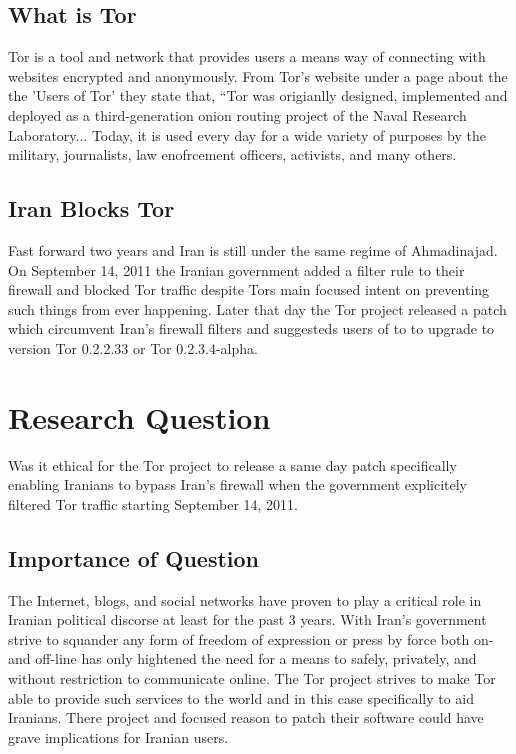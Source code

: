 \documentclass[11pt]{article}
\begin{document}
\begin{multicols}{2}
\subsection{What is Tor}

Tor is a tool and network that provides users a means way of connecting with
websites encrypted and anonymously. From Tor's website under a page about the
the 'Users of Tor' they state that, ``Tor was origianlly designed, implemented
and deployed as a third-generation onion routing project of the Naval Research
Laboratory... Today, it is used every day for a wide variety of purposes by the
military, journalists, law enofrcement officers, activists, and many others.

\subsection{Iran Blocks Tor}

Fast forward two years and Iran is still under the same regime of Ahmadinajad.
On September 14, 2011 the Iranian government added a filter rule to their
firewall and blocked Tor traffic despite Tors main focused intent on preventing
such things from ever happening\cite{IranBlocksTorSameDayFix}.  Later that day
the Tor project released a patch which circumvent Iran's firewall filters and
suggesteds users of to to upgrade to version Tor 0.2.2.33 or Tor
0.2.3.4-alpha\cite{IranBlocksTorSameDayFix}.






\section{Research Question} 
Was it ethical for the Tor project to release a same day patch specifically
enabling Iranians to bypass Iran's firewall when the government explicitely
filtered Tor traffic starting September 14, 2011.

\subsection{Importance of Question}

The Internet, blogs, and social networks have proven to play a critical role in
Iranian political discorse at least for the past 3 years. With Iran's government
strive to squander any form of freedom of expression or press by force both on-
and off-line has only hightened the need for a means to safely, privately, and
without restriction to communicate online. The Tor project strives to make Tor
able to provide such services to the world and in this case specifically to aid
Iranians. There project and focused reason to patch their software could have
grave implications for Iranian users.


\end{multicols}
\end{document}
